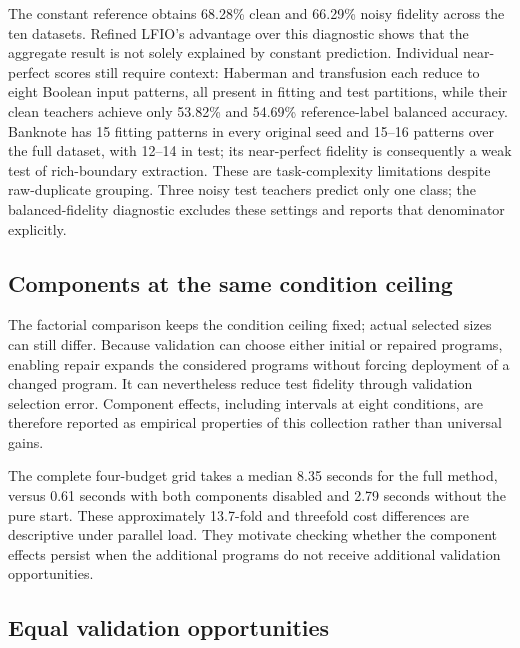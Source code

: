 \documentclass[a4paper,fleqn,review]{cas-sc}
\begin{document}

The constant reference obtains 68.28\% clean and 66.29\% noisy fidelity across the ten datasets. Refined LFIO's advantage over this diagnostic shows that the aggregate result is not solely explained by constant prediction. Individual near-perfect scores still require context: Haberman and transfusion each reduce to eight Boolean input patterns, all present in fitting and test partitions, while their clean teachers achieve only 53.82\% and 54.69\% reference-label balanced accuracy. Banknote has 15 fitting patterns in every original seed and 15--16 patterns over the full dataset, with 12--14 in test; its near-perfect fidelity is consequently a weak test of rich-boundary extraction. These are task-complexity limitations despite raw-duplicate grouping. Three noisy test teachers predict only one class; the balanced-fidelity diagnostic excludes these settings and reports that denominator explicitly.


\subsection{Components at the same condition ceiling}

The factorial comparison keeps the condition ceiling fixed; actual selected sizes can still differ. Because validation can choose either initial or repaired programs, enabling repair expands the considered programs without forcing deployment of a changed program. It can nevertheless reduce test fidelity through validation selection error. Component effects, including intervals at eight conditions, are therefore reported as empirical properties of this collection rather than universal gains.


The complete four-budget grid takes a median 8.35 seconds for the full method, versus 0.61 seconds with both components disabled and 2.79 seconds without the pure start. These approximately 13.7-fold and threefold cost differences are descriptive under parallel load. They motivate checking whether the component effects persist when the additional programs do not receive additional validation opportunities.

\subsection{Equal validation opportunities}\label{sec:slots}



\end{document}
